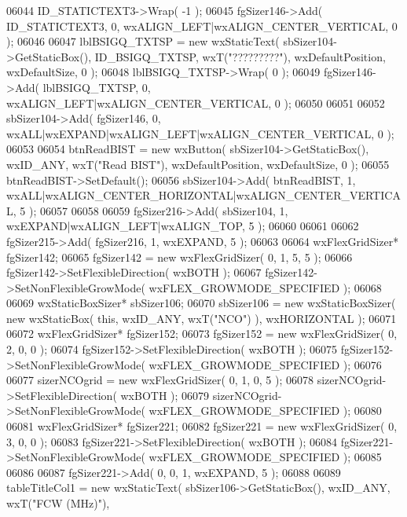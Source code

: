 \begin{DoxyCode}
06044     ID_STATICTEXT3->Wrap( -1 );
06045     fgSizer146->Add( ID_STATICTEXT3, 0, wxALIGN\_LEFT|wxALIGN\_CENTER\_VERTICAL, 0 );
06046     
06047     lblBSIGQ_TXTSP = \textcolor{keyword}{new} wxStaticText( sbSizer104->GetStaticBox(), 
      ID_BSIGQ_TXTSP, wxT(\textcolor{stringliteral}{"?????????"}), wxDefaultPosition, wxDefaultSize, 0 );
06048     lblBSIGQ_TXTSP->Wrap( 0 );
06049     fgSizer146->Add( lblBSIGQ_TXTSP, 0, wxALIGN\_LEFT|wxALIGN\_CENTER\_VERTICAL, 0 );
06050     
06051     
06052     sbSizer104->Add( fgSizer146, 0, wxALL|wxEXPAND|wxALIGN\_LEFT|wxALIGN\_CENTER\_VERTICAL, 0 );
06053     
06054     btnReadBIST = \textcolor{keyword}{new} wxButton( sbSizer104->GetStaticBox(), wxID\_ANY, wxT(\textcolor{stringliteral}{"Read BIST"}), wxDefaultPosition, 
      wxDefaultSize, 0 );
06055     btnReadBIST->SetDefault(); 
06056     sbSizer104->Add( btnReadBIST, 1, wxALL|wxALIGN\_CENTER\_HORIZONTAL|wxALIGN\_CENTER\_VERTICAL, 5 );
06057     
06058     
06059     fgSizer216->Add( sbSizer104, 1, wxEXPAND|wxALIGN\_LEFT|wxALIGN\_TOP, 5 );
06060     
06061     
06062     fgSizer215->Add( fgSizer216, 1, wxEXPAND, 5 );
06063     
06064     wxFlexGridSizer* fgSizer142;
06065     fgSizer142 = \textcolor{keyword}{new} wxFlexGridSizer( 0, 1, 5, 5 );
06066     fgSizer142->SetFlexibleDirection( wxBOTH );
06067     fgSizer142->SetNonFlexibleGrowMode( wxFLEX\_GROWMODE\_SPECIFIED );
06068     
06069     wxStaticBoxSizer* sbSizer106;
06070     sbSizer106 = \textcolor{keyword}{new} wxStaticBoxSizer( \textcolor{keyword}{new} wxStaticBox( \textcolor{keyword}{this}, wxID\_ANY, wxT(\textcolor{stringliteral}{"NCO"}) ), wxHORIZONTAL );
06071     
06072     wxFlexGridSizer* fgSizer152;
06073     fgSizer152 = \textcolor{keyword}{new} wxFlexGridSizer( 0, 2, 0, 0 );
06074     fgSizer152->SetFlexibleDirection( wxBOTH );
06075     fgSizer152->SetNonFlexibleGrowMode( wxFLEX\_GROWMODE\_SPECIFIED );
06076     
06077     sizerNCOgrid = \textcolor{keyword}{new} wxFlexGridSizer( 0, 1, 0, 5 );
06078     sizerNCOgrid->SetFlexibleDirection( wxBOTH );
06079     sizerNCOgrid->SetNonFlexibleGrowMode( wxFLEX\_GROWMODE\_SPECIFIED );
06080     
06081     wxFlexGridSizer* fgSizer221;
06082     fgSizer221 = \textcolor{keyword}{new} wxFlexGridSizer( 0, 3, 0, 0 );
06083     fgSizer221->SetFlexibleDirection( wxBOTH );
06084     fgSizer221->SetNonFlexibleGrowMode( wxFLEX\_GROWMODE\_SPECIFIED );
06085     
06086     
06087     fgSizer221->Add( 0, 0, 1, wxEXPAND, 5 );
06088     
06089     tableTitleCol1 = \textcolor{keyword}{new} wxStaticText( sbSizer106->GetStaticBox(), wxID\_ANY, wxT(\textcolor{stringliteral}{"FCW (MHz)"}), 

\end{DoxyCode}
